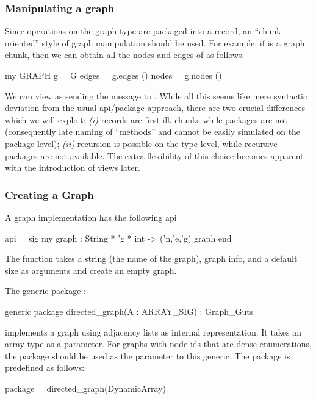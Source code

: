 \subsubsection{Manipulating a graph}
 
Since operations on the graph type are packaged into
a record, an ``chunk oriented'' style of graph manipulation should be used.
For example, if  is a graph chunk, then we can obtain all the
nodes and edges of  as follows.
\begin{SML}
 my GRAPH g = G
 edges = g.edges ()
 nodes = g.nodes ()
\end{SML}
We can view  as sending the message to .
While all this seems like mere syntactic deviation from the usual
 api/package approach, there are two crucial differences which
we will exploit:
\emph{(i)} records are first ilk chunks 
while packages are not (consequently
late naming of ``methods'' and cannot be easily simulated on the
package level); \emph{(ii)} recursion
is possible on the type level, while recursive packages are not available.
The extra flexibility of this choice becomes apparent with the
introduction of views later. 

\subsubsection{Creating a Graph}

A graph implementation has the following api
\begin{SML}
 api  = sig
   my graph : String * 'g * int -> ('n,'e,'g) graph
 end
\end{SML}
The function  takes a string (the name of the graph),
graph info, and a default size as arguments and create an empty graph.

The generic package :
\begin{SML}
 generic package directed_graph(A : ARRAY_SIG) : Graph_Guts
\end{SML}
implements a graph using adjacency lists as internal representation.
It takes an array type as a parameter.  For graphs with
node ids that are dense enumerations, the  package
should be used as the parameter to this generic. 
The package  is predefined as follows:
\begin{SML}
 package  = directed_graph(DynamicArray)
\end{SML}

